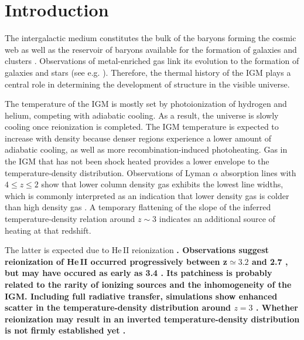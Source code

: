\documentclass[numberedappendix]{emulateapj}
\newcommand\ALc[1]{{\color{red} \bf #1}} %
\begin{document}
\section{Introduction}
The intergalactic medium constitutes the bulk of the baryons forming the cosmic web \citep{1996Natur.380..603B} as well as the reservoir of baryons available for the formation of galaxies and clusters \citep{1997ApJ...489....7R}. Observations of metal-enriched gas link its evolution to the formation of galaxies and stars (see e.g. \citet{2009A&A...493..409S,2010MNRAS.407.2063W}). Therefore, the thermal history of the IGM plays a central role in determining the development of structure in the visible universe.

The temperature of the IGM is mostly set by photoionization of hydrogen and helium, competing with adiabatic cooling. As a result, the universe is slowly cooling once reionization is completed. The IGM temperature is expected to increase with density because denser regions experience a lower amount of adiabatic cooling, as well as more recombination-induced photoheating. Gas in the IGM that has not been shock heated provides a lower envelope to the temperature-density distribution.  Observations of Lyman $\alpha$ absorption lines with $4\leqslant z \leqslant 2$ show that lower column density gas exhibits the lowest line widths, which is commonly interpreted as an indication that lower density gas is colder than high density gas \ALc{\citep{1997ApJ...484..672K,2000MNRAS.318..817S,2000ApJ...534...41R,2012ApJ...757L..30R}}. A temporary flattening of the slope of the inferred temperature-density relation around $z\sim 3$ indicates an additional source of heating at that redshift.

The latter is expected due to He\,\textsc{II} reionization \ALc{\citep[e.g.][]{2007MNRAS.380.1369T,2009ApJ...694..842M,2013MNRAS.435.3169C,2014arXiv1410.1531P}. Observations suggest reionization of He\,\textsc{II} occurred progressively between z$\simeq 3.2$ and 2.7 \citep{2001Sci...293.1112K,2014ApJ...784...42S}, but may have occured as early as 3.4 \citep{2014arXiv1405.7405W}.  Its patchiness is probably related to the rarity of ionizing sources and the inhomogeneity of the IGM.  Including full radiative transfer, simulations show enhanced scatter in the temperature-density distribution around $z=3$ \citep{2009ApJ...694..842M}. Whether reionization may result in an inverted temperature-density distribution \citep{2012MNRAS.423....7M} is not firmly established yet \citep{2013MNRAS.435.3169C}. }
\end{document}

